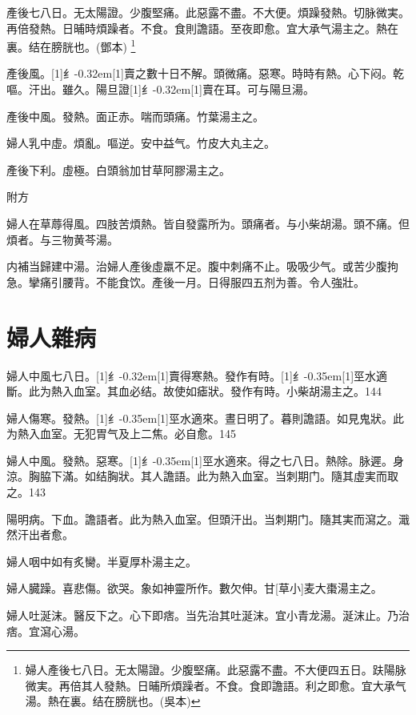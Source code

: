 \documentclass[oneside,b4paper]{ctexbook}
\begin{document}
\begin{flushleft}
產後七八日。无太陽證。少腹堅痛。此惡露不盡。不大便。煩躁發熱。切脉微実。再倍發熱。日晡時煩躁者。不食。食則譫語。至夜即愈。宜大承气湯主之。熱在裏。结在膀胱也。(鄧本)
\footnote{婦人產後七八日。无太陽證。少腹堅痛。此惡露不盡。不大便四五日。趺陽脉微実。再倍其人發熱。日晡所煩躁者。不食。食即譫語。利之即愈。宜大承气湯。熱在裏。结在膀胱也。(吳本)}

產後風。{\hbox{\scalebox{0.6}[1]{纟}\kern-0.32em\scalebox{0.7}[1]{賣}}}之數十日不解。頭微痛。惡寒。時時有熱。心下闷。乾嘔。汗出。雖久。陽旦證{\hbox{\scalebox{0.6}[1]{纟}\kern-0.32em\scalebox{0.7}[1]{賣}}}在耳。可与陽旦湯。

產後中風。發熱。面正赤。喘而頭痛。竹葉湯主之。

婦人乳中虛。煩亂。嘔逆。安中益气。竹皮大丸主之。

產後下利。虛極。白頭翁加甘草阿膠湯主之。

附方

婦人在草蓐得風。四肢苦煩熱。皆自發露所为。頭痛者。与小柴胡湯。頭不痛。但煩者。与三物黄芩湯。

内補当歸建中湯。治婦人產後虛羸不足。腹中刺痛不止。吸吸少气。或苦少腹拘急。攣痛引腰背。不能食饮。產後一月。日得服四五剂为善。令人強壯。

\chapter{婦人雜病}

婦人中風七八日。{\hbox{\scalebox{0.6}[1]{纟}\kern-0.32em\scalebox{0.7}[1]{賣}}}得寒熱。發作有時。{\hbox{\scalebox{0.68}[1]{纟}\kern-0.35em\scalebox{0.64}[1]{巠}}}水適斷。此为熱入血室。其血必结。故使如瘧狀。發作有時。小柴胡湯主之。144

婦人傷寒。發熱。{\hbox{\scalebox{0.68}[1]{纟}\kern-0.35em\scalebox{0.64}[1]{巠}}}水適來。晝日明了。暮則譫語。如見鬼狀。此为熱入血室。无犯胃气及上二焦。必自愈。145

婦人中風。發熱。惡寒。{\hbox{\scalebox{0.68}[1]{纟}\kern-0.35em\scalebox{0.64}[1]{巠}}}水適來。得之七八日。熱除。脉遲。身涼。胸脇下滿。如结胸狀。其人譫語。此为熱入血室。当刺期门。隨其虛実而取之。143

陽明病。下血。譫語者。此为熱入血室。但頭汗出。当刺期门。隨其実而瀉之。濈然汗出者愈。

婦人咽中如有炙臠。半夏厚朴湯主之。

婦人臓躁。喜悲傷。欲哭。象如神靈所作。數欠伸。甘[草小]麦大棗湯主之。

婦人吐涎沫。醫反下之。心下即痞。当先治其吐涎沫。宜小青龙湯。涎沫止。乃治痞。宜瀉心湯。


\end{flushleft}
\end{document}
